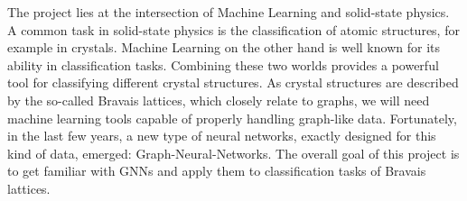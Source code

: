 The project lies at the intersection of Machine Learning and solid-state physics. 
A common task in solid-state physics is the classification of atomic structures, for example in crystals.
Machine Learning on the other hand is well known for its ability in classification tasks. Combining these two worlds provides a powerful tool for 
classifying different crystal structures. 
As crystal structures are described by the so-called Bravais lattices, which closely relate to graphs, we will need machine learning tools capable of properly handling graph-like data.
Fortunately, in the last few years, a new type of neural networks, exactly designed for this kind of data, emerged: Graph-Neural-Networks.
The overall goal of this project is to get familiar with GNNs and apply them to classification tasks of Bravais lattices.